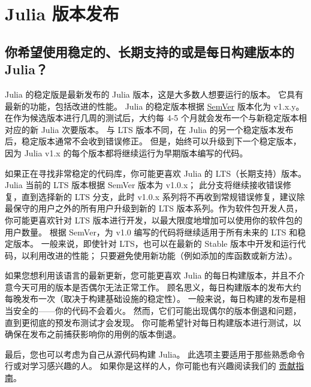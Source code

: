 \hypertarget{13975497382718262394}{}


\section{Julia 版本发布}



\hypertarget{9334472587960710746}{}


\subsection{你希望使用稳定的、长期支持的或是每日构建版本的Julia？}



Julia 的稳定版是最新发布的 Julia 版本，这是大多数人想要运行的版本。 它具有最新的功能，包括改进的性能。 Julia 的稳定版本根据 \href{https://semver.org/}{SemVer} 版本化为 v1.x.y。 在作为候选版本进行几周的测试后，大约每 4-5 个月就会发布一个与新稳定版本相对应的新 Julia 次要版本。 与 LTS 版本不同，在 Julia 的另一个稳定版本发布后，稳定版本通常不会收到错误修正。 但是，始终可以升级到下一个稳定版本，因为 Julia v1.x 的每个版本都将继续运行为早期版本编写的代码。



如果正在寻找非常稳定的代码库，你可能更喜欢 Julia 的 LTS（长期支持）版本。 Julia 当前的 LTS 版本根据 SemVer 版本为 v1.0.x； 此分支将继续接收错误修复，直到选择新的 LTS 分支，此时 v1.0.x 系列将不再收到常规错误修复，建议除最保守的用户之外的所有用户升级到新的 LTS 版本系列。作为软件包开发人员，你可能更喜欢针对 LTS 版本进行开发，以最大限度地增加可以使用你的软件包的用户数量。 根据 SemVer，为 v1.0 编写的代码将继续适用于所有未来的 LTS 和稳定版本。 一般来说，即使针对 LTS，也可以在最新的 Stable 版本中开发和运行代码，以利用改进的性能； 只要避免使用新功能（例如添加的库函数或新方法）。



如果您想利用该语言的最新更新，您可能更喜欢 Julia 的每日构建版本，并且不介意今天可用的版本是否偶尔无法正常工作。 顾名思义，每日构建版本的发布大约每晚发布一次（取决于构建基础设施的稳定性）。 一般来说，每日构建的发布是相当安全的——你的代码不会着火。 然而，它们可能出现偶尔的版本倒退和问题，直到更彻底的预发布测试才会发现。 你可能希望针对每日构建版本进行测试，以确保在发布之前捕获影响你的用例的版本倒退。



最后，您也可以考虑为自己从源代码构建 Julia。 此选项主要适用于那些熟悉命令行或对学习感兴趣的人。 如果你是这样的人，你可能也有兴趣阅读我们的 \href{https://github.com/JuliaLang/julia/blob/master/CONTRIBUTING.md}{贡献指南}。



